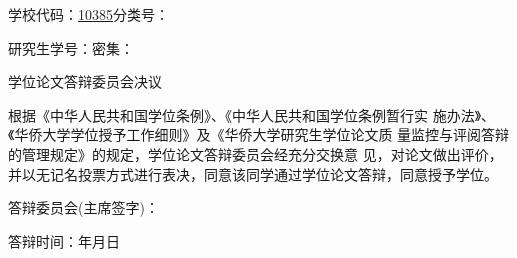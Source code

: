 \documentclass{report}
\begin{document}
\ttfamily\fontsize{10.5pt}{21pt}\selectfont
\noindent 学校代码：\hspace{6pt}\underline{\textrm{10385}}\hfill 分类号：\underline{\hspace{72pt}}

\noindent 研究生学号：\underline{\hspace{140pt}}\hfill 密\hspace{10.5pt}集：\underline{\hspace{72pt}}

\begin{figure}[H]
\noindent{}
\end{figure}

\newpage
\begin{center}
\sffamily\fontsize{16pt}{25pt}\selectfont 学\hspace{8pt}位\hspace{8pt}论\hspace{8pt}文\hspace{8pt}答\hspace{8pt}辩\hspace{8pt}委\hspace{8pt}员\hspace{8pt}会\hspace{8pt}决\hspace{8pt}议
\end{center} \vspace{51pt}
\fontsize{14pt}{26pt}\selectfont
\noindent\hspace{28pt}\rmfamily 根据《中华人民共和国学位条例》、《中华人民共和国学位条例暂行实 施办法》、《华侨大学学位授予工作细则》及《华侨大学研究生学位论文质 量监控与评阅答辩的管理规定》的规定，学位论文答辩委员会经充分交换意 见，对论文做出评价，并以无记名投票方式进行表决，同意该同学通过\degree 学位论文答辩，同意授予\degree 学位。\vspace{192pt}

\noindent\flushright 答辩委员会(主席签字)：\underline{\hspace{156pt}}\vspace{14pt}

\noindent\flushright 答辩时间：\underline{\hspace{60pt}}年\underline{\hspace{25pt}}月\underline{\hspace{25pt}}日
\restoregeometry
\end{document}

